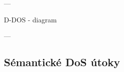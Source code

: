 \documentclass[
  printed, %
  table,   %
  lof,     %
  lot,     %
]{fithesis3}
\begin{document}

---

D-DOS - diagram

---

\subsection{Sémantické DoS útoky}
\end{document}
